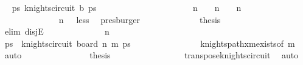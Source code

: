 \begin{isabellebody}
\ \isamarkupfalse%
\ {\isachardoublequoteopen}{\isasymexists}ps{\isachardot}{\kern0pt}\ knights{\isacharunderscore}{\kern0pt}circuit\ {\isacharquery}{\kern0pt}b\ ps{\isachardoublequoteclose}\isanewline
\ \ \ \ \ \ \ \ \isamarkupfalse%
\ {\isacharminus}{\kern0pt}\isanewline
\ \ \ \ \ \ \ \ \ \ \isamarkupfalse%
\ {\isachardoublequoteopen}n{\isacharminus}{\kern0pt}{}\ {\isacharequal}{\kern0pt}\ {}\ {\isasymor}\ n{\isacharminus}{\kern0pt}{}\ {\isacharequal}{\kern0pt}\ {}\ {\isasymor}\ n{\isacharminus}{\kern0pt}{}\ {\isasymge}\ {}{}{\isachardoublequoteclose}\ \isanewline
\ \ \ \ \ \ \ \ \ \ \ \ \isamarkupfalse%
\ {\isacartoucheopen}n{\isacharminus}{\kern0pt}{}\ {\isasymge}\ {}{\isacartoucheclose}\ less\ \isamarkupfalse%
\ presburger\isanewline
\ \ \ \ \ \ \ \ \ \ \isamarkupfalse%
\ \isamarkupfalse%
\ {\isacharquery}{\kern0pt}thesis\isanewline
\ \ \ \ \ \ \ \ \ \ \isamarkupfalse%
\ {\isacharparenleft}{\kern0pt}elim\ disjE{\isacharparenright}{\kern0pt}\isanewline
\ \ \ \ \ \ \ \ \ \ \ \ \isamarkupfalse%
\ {\isachardoublequoteopen}n{\isacharminus}{\kern0pt}{}\ {\isacharequal}{\kern0pt}\ {}{\isachardoublequoteclose}\isanewline
\ \ \ \ \ \ \ \ \ \ \ \ \isamarkupfalse%
\ \isamarkupfalse%
\ ps\ \ {\isachardoublequoteopen}knights{\isacharunderscore}{\kern0pt}circuit\ {\isacharparenleft}{\kern0pt}board\ {\isacharparenleft}{\kern0pt}n{\isacharminus}{\kern0pt}{}{\isacharparenright}{\kern0pt}\ m{\isacharparenright}{\kern0pt}\ ps{\isachardoublequoteclose}\isanewline
\ \ \ \ \ \ \ \ \ \ \ \ \ \ \isamarkupfalse%
\ knights{\isacharunderscore}{\kern0pt}path{\isacharunderscore}{\kern0pt}{}xm{\isacharunderscore}{\kern0pt}exists{\isacharbrackleft}{\kern0pt}of\ m{\isacharbrackright}{\kern0pt}\ \isamarkupfalse%
\ auto\isanewline
\ \ \ \ \ \ \ \ \ \ \ \ \isamarkupfalse%
\ \isamarkupfalse%
\ {\isacharquery}{\kern0pt}thesis\ \isanewline
\ \ \ \ \ \ \ \ \ \ \ \ \ \ \isamarkupfalse%
\ transpose{\isacharunderscore}{\kern0pt}knights{\isacharunderscore}{\kern0pt}circuit\ \isamarkupfalse%
\ auto\isanewline
\ \ \ \ \ \ \ \ \ \ \isamarkupfalse%
\isanewline
\ \ \ \ \ \ \ \ \ \ \ \ \isamarkupfalse%

\end{isabellebody}
